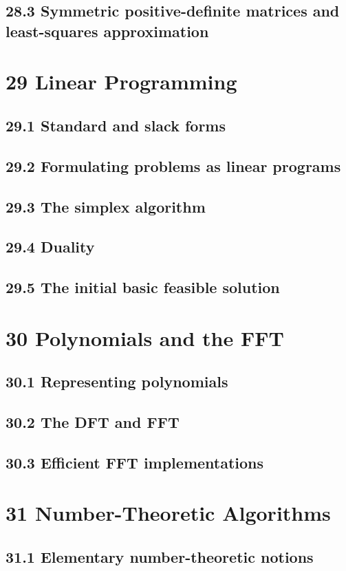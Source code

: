 \documentclass[a4paper]{article}
\begin{document}
\subsection{28.3 Symmetric positive-definite matrices and least-squares approximation}

\section{29 Linear Programming}
\subsection{29.1 Standard and slack forms}
\subsection{29.2 Formulating problems as linear programs}
\subsection{29.3 The simplex algorithm}
\subsection{29.4 Duality}
\subsection{29.5 The initial basic feasible solution}

\section{30 Polynomials and the FFT}
\subsection{30.1 Representing polynomials}
\subsection{30.2 The DFT and FFT}
\subsection{30.3 Efficient FFT implementations}

\section{31 Number-Theoretic Algorithms}
\subsection{31.1 Elementary number-theoretic notions}
\end{document}
